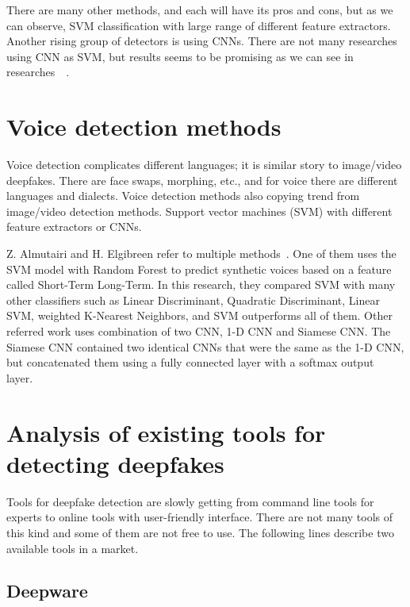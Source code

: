 There are many other methods, and each will have its pros and cons, but as we can observe, SVM classification with large range of different feature extractors. Another rising group of detectors is using CNNs. There are not many researches using CNN as SVM, but results seems to be promising as we can see in researches~\cite{3DCNNArchitecturesAndAttentionMechanismsForDeepfakeDetection}~\cite{CapsuleForensicsNetworksForDeepfakeDetection}.

\section{Voice detection methods}

Voice detection complicates different languages; it is similar story to image/video deepfakes. There are face swaps, morphing, etc., and for voice there are different languages and dialects. Voice detection methods also copying trend from image/video detection methods. Support vector machines (SVM) with different feature extractors or CNNs.

Z. Almutairi and H. Elgibreen refer to multiple methods~\cite{ReviewOfModernAudioDeepfakeDetectionMethods}. One of them uses the SVM model with Random Forest to predict synthetic voices based on a feature called Short-Term Long-Term. In this research, they compared SVM with many other classifiers such as Linear Discriminant, Quadratic Discriminant, Linear SVM, weighted K-Nearest Neighbors, and SVM outperforms all of them. Other referred work uses combination of two CNN, 1-D CNN and Siamese CNN. The Siamese CNN contained two identical CNNs that were the same as the 1-D CNN, but concatenated them using a fully connected layer with a softmax output layer.~\cite{ReviewOfModernAudioDeepfakeDetectionMethods}

\section{Analysis of existing tools for detecting deepfakes}

Tools for deepfake detection are slowly getting from command line tools for experts to online tools with user-friendly interface. There are not many tools of this kind and some of them are not free to use. The following lines describe two available tools in a market.

\subsection{Deepware}

